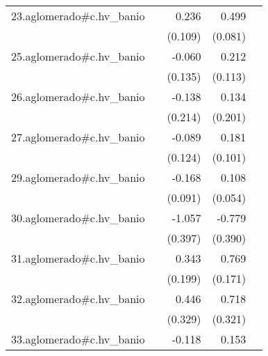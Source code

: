 {\begin{longtable}{l*{4}{D{.}{.}{-1}}}
\addlinespace
23.aglomerado#c.hv\_banio&                     &       0.236\sym{*}  &       0.499\sym{***}&                     \\
            &                     &     (0.109)         &     (0.081)         &                     \\
\addlinespace
25.aglomerado#c.hv\_banio&                     &      -0.060         &       0.212         &                     \\
            &                     &     (0.135)         &     (0.113)         &                     \\
\addlinespace
26.aglomerado#c.hv\_banio&                     &      -0.138         &       0.134         &                     \\
            &                     &     (0.214)         &     (0.201)         &                     \\
\addlinespace
27.aglomerado#c.hv\_banio&                     &      -0.089         &       0.181         &                     \\
            &                     &     (0.124)         &     (0.101)         &                     \\
\addlinespace
29.aglomerado#c.hv\_banio&                     &      -0.168         &       0.108\sym{*}  &                     \\
            &                     &     (0.091)         &     (0.054)         &                     \\
\addlinespace
30.aglomerado#c.hv\_banio&                     &      -1.057\sym{**} &      -0.779\sym{*}  &                     \\
            &                     &     (0.397)         &     (0.390)         &                     \\
\addlinespace
31.aglomerado#c.hv\_banio&                     &       0.343         &       0.769\sym{***}&                     \\
            &                     &     (0.199)         &     (0.171)         &                     \\
\addlinespace
32.aglomerado#c.hv\_banio&                     &       0.446         &       0.718\sym{*}  &                     \\
            &                     &     (0.329)         &     (0.321)         &                     \\
\addlinespace
33.aglomerado#c.hv\_banio&                     &      -0.118         &       0.153\sym{***}&                     \\

\end{longtable}}
